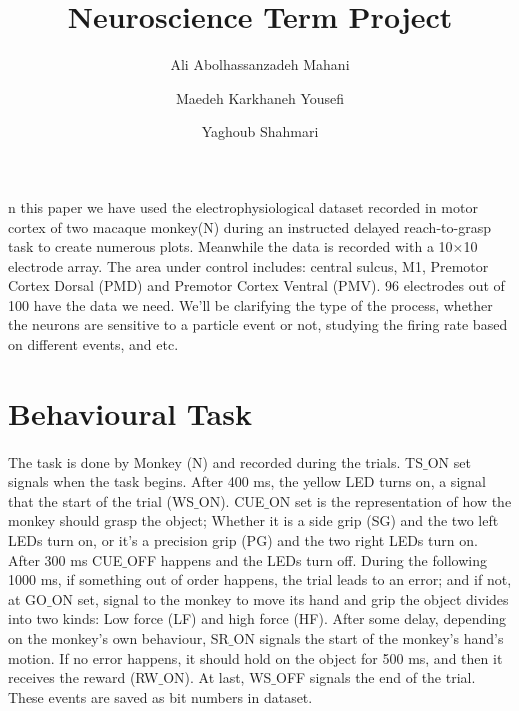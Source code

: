 \documentclass[9pt,twocolumn]{paper-template}
\title{Neuroscience Term Project}
\author[a]{Ali Abolhassanzadeh Mahani}
\author[a]{Maedeh Karkhaneh Yousefi}
\author[a]{Yaghoub Shahmari}
\affil[a]{Student, Physics Department, Sharif University of Technology}
\begin{document}
\maketitle
\thispagestyle{firststyle}

n this paper we have used the electrophysiological dataset recorded in motor cortex of two macaque monkey(N) during an instructed delayed reach-to-grasp task to create numerous plots. Meanwhile the data is recorded with a 10$ \times $10 electrode array. The area under control includes: central sulcus, M1, Premotor Cortex Dorsal (PMD) and Premotor Cortex Ventral (PMV). 96 electrodes out of 100 have the data we need.
We'll be clarifying the type of the process, whether the neurons are sensitive to a particle event or not, studying the firing rate based on different events, and etc. \cite{dataset}
\section*{Behavioural Task}
\paragraph*{}
The task is done by Monkey (N) and recorded during the trials. TS$ \_ $ON set signals when the task begins. After 400 ms, the yellow LED turns on, a signal that the start of the trial (WS$ \_ $ON). CUE$ \_ $ON set is the representation of how the monkey should grasp the object; Whether it is a side grip (SG) and the two left LEDs turn on, or it's a precision grip (PG) and the two right LEDs turn on. After 300 ms CUE$ \_ $OFF happens and the LEDs turn off. During the following 1000 ms, if something out of order happens, the trial leads to an error; and if not, at GO$ \_ $ON set, signal to the monkey to move its hand and grip the object divides into two kinds: Low force (LF) and high force (HF). After some delay, depending on the monkey's own behaviour, SR$ \_ $ON signals the start of the monkey's hand's motion. If no error happens, it should hold on the object for 500 ms, and then it receives the reward (RW$ \_ $ON). At last, WS$ \_ $OFF signals the end of the trial. These events are saved as bit numbers in dataset.
\end{document}

